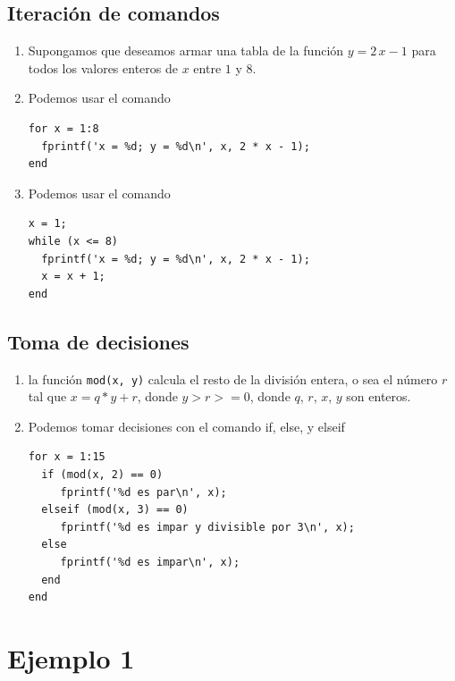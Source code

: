 \subsection{Iteraci\'{o}n de comandos}

\begin{enumerate}

\item Supongamos que deseamos armar una tabla de la funci\'{o}n $y = 2
  \, x - 1$ para todos los valores enteros de $x$ entre $1$ y $8$.

\item Podemos usar el comando 
\begin{verbatim}
for x = 1:8
  fprintf('x = %d; y = %d\n', x, 2 * x - 1);
end
\end{verbatim}

\item Podemos usar el comando 
\begin{verbatim}
x = 1;
while (x <= 8)
  fprintf('x = %d; y = %d\n', x, 2 * x - 1);
  x = x + 1; 
end
\end{verbatim}

\end{enumerate}

\subsection{Toma de decisiones}

\begin{enumerate}

\item la funci\'{o}n \verb-mod(x, y)- calcula el resto de la
  divisi\'{o}n entera, o sea el n\'{u}mero $r$ tal
  que $x = q * y + r$, donde $y > r >= 0$, donde $q$, $r$, $x$, $y$
  son enteros.

\item Podemos tomar decisiones con el comando if, else, y elseif
\begin{verbatim}
for x = 1:15
  if (mod(x, 2) == 0)
     fprintf('%d es par\n', x);
  elseif (mod(x, 3) == 0)
     fprintf('%d es impar y divisible por 3\n', x);
  else
     fprintf('%d es impar\n', x);
  end
end
\end{verbatim}

\end{enumerate}

\section{Ejemplo 1}

